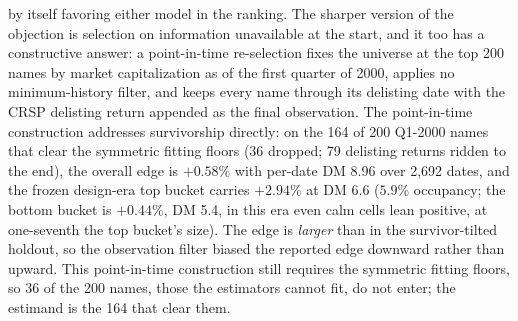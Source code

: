 \documentclass[11pt]{article}
\theoremstyle{remark}
\begin{document}
by itself favoring either model in the ranking. The sharper version
of the objection is selection on information unavailable at the
start, and it too has a constructive answer: a point-in-time
re-selection fixes the universe at the top 200 names by market
capitalization as of the first quarter of 2000, applies no
minimum-history filter, and keeps every name through its delisting
date with the CRSP delisting return appended as the final
observation.
The point-in-time construction addresses survivorship directly: on
the 164 of 200 Q1-2000 names that clear the symmetric fitting floors
(36 dropped; 79 delisting returns ridden to the end), the overall
edge is $+0.58\%$ with per-date DM 8.96 over 2{,}692 dates, and the
frozen design-era top bucket carries $+2.94\%$ at DM 6.6 ($5.9\%$
occupancy; the bottom bucket is $+0.44\%$, DM 5.4, in this era even calm cells lean positive, at one-seventh the top bucket's size).
The edge is \emph{larger} than in the survivor-tilted holdout, so the
observation filter biased the reported edge downward rather than
upward. This point-in-time construction still requires the symmetric
fitting floors, so 36 of the 200 names, those the estimators cannot
fit, do not enter; the estimand is the 164 that clear them.
\end{document}
